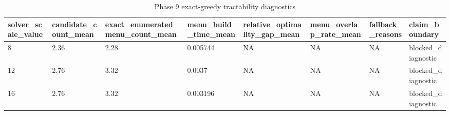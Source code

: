 \begin{table}[ht]
\centering
\begin{tabular}{llllllll}
 \hline
solver\_scale\_value & candidate\_count\_mean & exact\_enumerated\_menu\_count\_mean & menu\_build\_time\_mean & relative\_optimality\_gap\_mean & menu\_overlap\_rate\_mean & fallback\_reasons & claim\_boundary \\
 \hline
8 & 2.36 & 2.28 & 0.005744 & NA & NA & NA & blocked\_diagnostic \\
12 & 2.76 & 3.32 & 0.0037 & NA & NA & NA & blocked\_diagnostic \\
16 & 2.76 & 3.32 & 0.003196 & NA & NA & NA & blocked\_diagnostic \\
 \hline
\end{tabular}
\caption{Phase 9 exact-greedy tractability diagnostics}
\end{table}
